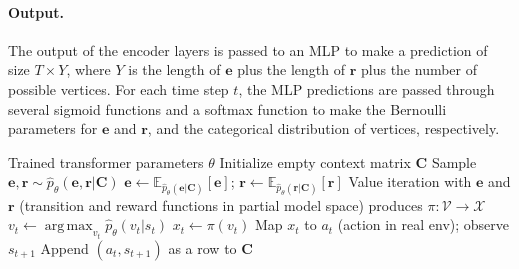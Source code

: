 \documentclass[sigconf]{aamas}
\DeclareMathOperator*{\argmax}{arg\,max}
\begin{document}
\paragraph{Output.} The output of the encoder layers is passed to an MLP to make a prediction of size $T \times Y$, where $Y$ is the length of $\mathbf{e}$ plus the length of $\mathbf{r}$ plus the number of possible vertices. For each time step $t$, the MLP predictions are passed through several sigmoid functions and a softmax function to make the Bernoulli parameters for $\mathbf{e}$ and $\mathbf{r}$, and the categorical distribution of vertices, respectively.
\begin{algorithm}[t]
  \caption{Posterior Sampling}
  \label{alg:test}
  \begin{algorithmic}
    \REQUIRE Trained transformer parameters $\theta$
    \STATE Initialize empty context matrix $\mathbf{C}$
    \STATE Sample $\mathbf{e}, \mathbf{r} \sim \hat{p}_\theta(\mathbf{e}, \mathbf{r}|\mathbf{C})$
    \STATE $\mathbf{e} \gets \mathbb{E}_{\hat{p}_\theta(\mathbf{e}|\mathbf{C})}[\mathbf{e}]$; $\mathbf{r} \gets \mathbb{E}_{\hat{p}_\theta( \mathbf{r}|\mathbf{C})}[\mathbf{r}]$
    \ENDIF
    \STATE Value iteration with $\mathbf{e}$ and $\mathbf{r}$ (transition and reward functions in partial model space) produces $\pi : \mathscr{V} \rightarrow \mathscr{X}$
    \STATE $v_t \gets \argmax_{v_t} \hat{p}_\theta(v_t|s_t)$
    \STATE $x_t \gets \pi(v_t)$
    \STATE Map $x_t$ to $a_t$ (action in real env); observe $s_{t+1}$
    \STATE Append $(a_t, s_{t+1})$ as a row to $\mathbf{C}$
    \ENDFOR
  \end{algorithmic}
\end{algorithm}
\end{document}
